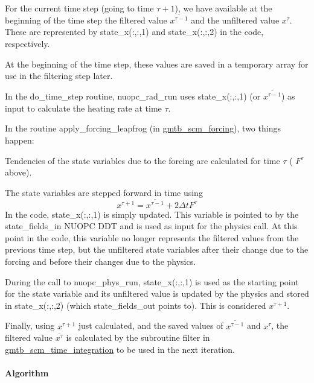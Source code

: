 \begin{DoxyItemize}
\item For the current time step (going to time $\tau + 1$), we have available at the beginning of the time step the filtered value $\overline{x^{\tau-1}}$ and the unfiltered value $x^\tau$. These are represented by state\+\_\+x(\+:,\+:,1) and state\+\_\+x(\+:,\+:,2) in the code, respectively.
\item At the beginning of the time step, these values are saved in a temporary array for use in the filtering step later.
\item In the do\+\_\+time\+\_\+step routine, nuopc\+\_\+rad\+\_\+run uses state\+\_\+x(\+:,\+:,1) (or $\overline{x^{\tau -1}}$) as input to calculate the heating rate at time $\tau$.
\item In the routine apply\+\_\+forcing\+\_\+leapfrog (in \hyperlink{group__forcing}{gmtb\+\_\+scm\+\_\+forcing}), two things happen\+:
\begin{DoxyEnumerate}
\item Tendencies of the state variables due to the forcing are calculated for time $\tau$ ( $F^\tau$ above).
\item The state variables are stepped forward in time using \[ x^{\tau+1}=\overline{x^{\tau -1}} + 2\Delta tF^\tau \] In the code, state\+\_\+x(\+:,\+:,1) is simply updated. This variable is pointed to by the state\+\_\+fields\+\_\+in N\+U\+O\+PC D\+DT and is used as input for the physics call. At this point in the code, this variable no longer represents the filtered values from the previous time step, but the unfiltered state variables after their change due to the forcing and before their changes due to the physics.
\end{DoxyEnumerate}
\item During the call to nuopc\+\_\+phys\+\_\+run, state\+\_\+x(\+:,\+:,1) is used as the starting point for the state variable and its unfiltered value is updated by the physics and stored in state\+\_\+x(\+:,\+:,2) (which state\+\_\+fields\+\_\+out points to). This is considered $x^{\tau +1}$.
\item Finally, using $x^{\tau +1}$ just calculated, and the saved values of $\overline{x^{\tau-1}}$ and $x^\tau$, the filtered value $\overline{x^\tau}$ is calculated by the subroutine filter in \hyperlink{group__time__integration}{gmtb\+\_\+scm\+\_\+time\+\_\+integration} to be used in the next iteration.
\end{DoxyItemize}\hypertarget{group___s_c_m_time_loop_algorithm}{}\paragraph{Algorithm}\label{group___s_c_m_time_loop_algorithm}

